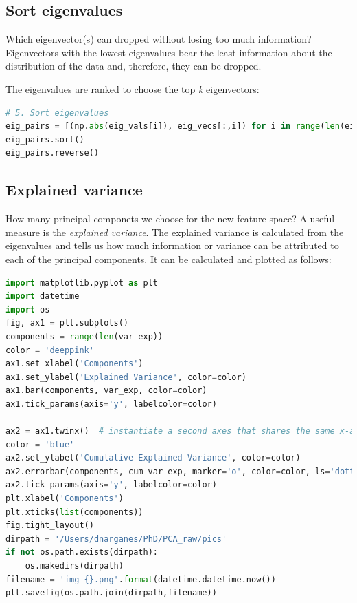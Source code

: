 \subsection{Sort eigenvalues}
Which eigenvector(s) can dropped without losing too much information? Eigenvectors with the lowest eigenvalues bear the least information about the distribution of the data and, therefore, they can be dropped.

The eigenvalues are ranked to choose the top \emph{k} eigenvectors:

\begin{lstlisting}[language=Python]
# 5. Sort eigenvalues
eig_pairs = [(np.abs(eig_vals[i]), eig_vecs[:,i]) for i in range(len(eig_vals))]
eig_pairs.sort()
eig_pairs.reverse()
\end{lstlisting}

\subsection{Explained variance}

How many principal componets we choose for the new feature space? A useful measure is the \emph{explained variance}. The explained variance is calculated from the eigenvalues and tells us how much information or variance can be attributed to each of the principal components. It can be calculated and plotted as follows:

\begin{lstlisting}[language=Python]
import matplotlib.pyplot as plt
import datetime
import os
fig, ax1 = plt.subplots()
components = range(len(var_exp))
color = 'deeppink'
ax1.set_xlabel('Components')
ax1.set_ylabel('Explained Variance', color=color)
ax1.bar(components, var_exp, color=color)
ax1.tick_params(axis='y', labelcolor=color)

ax2 = ax1.twinx()  # instantiate a second axes that shares the same x-axis
color = 'blue'
ax2.set_ylabel('Cumulative Explained Variance', color=color)
ax2.errorbar(components, cum_var_exp, marker='o', color=color, ls='dotted')
ax2.tick_params(axis='y', labelcolor=color)
plt.xlabel('Components')
plt.xticks(list(components))
fig.tight_layout()
dirpath = '/Users/dnarganes/PhD/PCA_raw/pics'
if not os.path.exists(dirpath):
    os.makedirs(dirpath)
filename = 'img_{}.png'.format(datetime.datetime.now())
plt.savefig(os.path.join(dirpath,filename))
\end{lstlisting}

